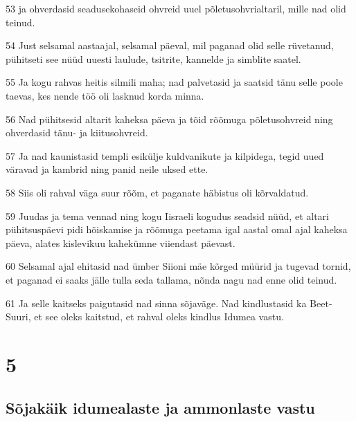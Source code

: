 \par 53 ja ohverdasid seadusekohaseid ohvreid uuel põletusohvrialtaril, mille nad olid teinud.
\par 54 Just selsamal aastaajal, selsamal päeval, mil paganad olid selle rüvetanud, pühitseti see nüüd uuesti laulude, tsitrite, kannelde ja simblite saatel.
\par 55 Ja kogu rahvas heitis silmili maha; nad palvetasid ja saatsid tänu selle poole taevas, kes nende töö oli lasknud korda minna.
\par 56 Nad pühitsesid altarit kaheksa päeva ja tõid rõõmuga põletusohvreid ning ohverdasid tänu- ja kiitusohvreid.
\par 57 Ja nad kaunistasid templi esikülje kuldvanikute ja kilpidega, tegid uued väravad ja kambrid ning panid neile uksed ette.
\par 58 Siis oli rahval väga suur rõõm, et paganate häbistus oli kõrvaldatud.
\par 59 Juudas ja tema vennad ning kogu Iisraeli kogudus seadsid nüüd, et altari pühitsuspäevi pidi hõiskamise ja rõõmuga peetama igal aastal omal ajal kaheksa päeva, alates kislevikuu kahekümne viiendast päevast.
\par 60 Selsamal ajal ehitasid nad ümber Siioni mäe kõrged müürid ja tugevad tornid, et paganad ei saaks jälle tulla seda tallama, nõnda nagu nad enne olid teinud.
\par 61 Ja selle kaitseks paigutasid nad sinna sõjaväge. Nad kindlustasid ka Beet-Suuri, et see oleks kaitstud, et rahval oleks kindlus Idumea vastu.

\chapter{5}

\section*{Sõjakäik idumealaste ja ammonlaste vastu}

